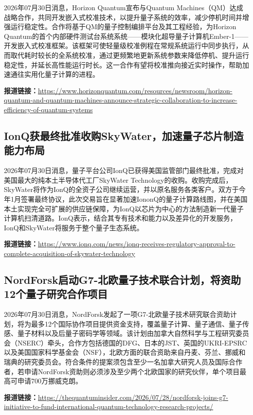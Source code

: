 \documentclass[12pt,a4paper]{ctexart}
\begin{document}
2026年07月30日消息，Horizon Quantum宣布与Quantum Machines（QM）达成战略合作，共同开发嵌入式校准技术，以提升量子系统的效率，减少停机时间并增强运行稳定性。合作将基于QM的量子控制编排平台及其工程经验，为Horizon Quantum的首个内部硬件测试台系统系统——模块化超导量子计算机Ember-1——开发嵌入式校准框架。该框架可使轻量级校准例程在常规系统运行中同步执行，从而取代耗时较长的全系统校准，通过更频繁地更新系统参数来降低停机、提升运行稳定性，并延长高性能运行时长。这一合作有望将校准推向接近实时操作，帮助加速通往实用化量子计算的进程。

\noindent\textbf{报道链接：}\url{https://www.horizonquantum.com/resources/newsroom/horizon-quantum-and-quantum-machines-announce-strategic-collaboration-to-increase-efficiency-of-quantum-systems}

\subsection{ IonQ获最终批准收购SkyWater，加速量子芯片制造能力布局 }

2026年07月30日消息，量子平台公司IonQ已获得美国监管部门最终批准，完成对美国最大的纯本土半导体代工厂SkyWater Technology的收购。收购完成后，SkyWater将作为IonQ的全资子公司继续运营，并以原名服务各类客户。双方于今年1月签署最终协议，此次交易旨在显著加速IononQ的量子计算路线图，并在美国本土实现完全可扩展的供应链保障，为IonQ以芯片为中心的方法制造新一代量子计算机扫清道路。IonQ表示，结合其专有技术和能力以及差异化的开发服务，IonQ和SkyWater将服务于整个量子生态系统。

\noindent\textbf{报道链接：}\url{https://www.ionq.com/news/ionq-receives-regulatory-approval-to-complete-acquisition-of-skywater-technology}

\subsection{ NordForsk启动G7-北欧量子技术联合计划，将资助12个量子研究合作项目 }

2026年07月30日消息，NordForsk发起了一项G7-北欧量子技术研究联合资助计划，将为最多12个国际协作项目提供资金支持，覆盖量子计算、量子通信、量子传感、量子材料以及后量子密码学等领域。该计划由加拿大自然科学与工程研究委员会（NSERC）牵头，合作方包括德国的DFG、日本的JST、英国的UKRI-EPSRC以及美国国家科学基金会（NSF），北欧方面的联合资助来自丹麦、芬兰、挪威和瑞典的研究委员会。符合条件的提案须包含至少一名加拿大研究人员及国际合作者，若申请NordForsk资助则必须涉及至少两个北欧国家的研究伙伴，单个项目最高可申请700万挪威克朗。

\noindent\textbf{报道链接：}\url{https://thequantuminsider.com/2026/07/28/nordforsk-joins-g7-initiative-to-fund-international-quantum-technology-research-projects/}
\end{document}
